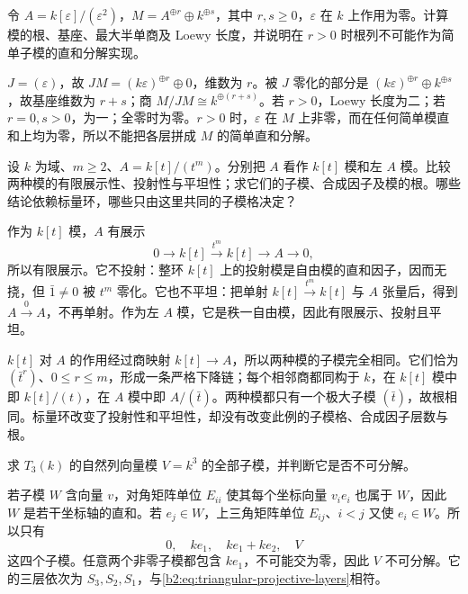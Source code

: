 \begin{exercise}\label{b2:ex:15-dual-numbers-loewy}
	令 \(A=k[\varepsilon]/(\varepsilon^2)\)，\(M=A^{\oplus r}\oplus k^{\oplus s}\)，其中 \(r,s\ge0\)，\(\varepsilon\) 在 \(k\) 上作用为零。计算模的根、基座、最大半单商及 Loewy 长度，并说明在 \(r>0\) 时根列不可能作为简单子模的直和分解实现。
\end{exercise}
\begin{solution}
	\(J=(\varepsilon)\)，故 \(JM=(k\varepsilon)^{\oplus r}\oplus0\)，维数为 \(r\)。被 \(J\) 零化的部分是 \((k\varepsilon)^{\oplus r}\oplus k^{\oplus s}\)，故基座维数为 \(r+s\)；商 \(M/JM\cong k^{\oplus(r+s)}\)。若 \(r>0\)，Loewy 长度为二；若 \(r=0,s>0\)，为一；全零时为零。\(r>0\) 时，\(\varepsilon\) 在 \(M\) 上非零，而在任何简单模直和上均为零，所以不能把各层拼成 \(M\) 的简单直和分解。
\end{solution}

\begin{exercise}\label{b2:ex:15-change-of-scalars-truncated}
	设 \(k\) 为域、\(m\ge2\)、\(A=k[t]/(t^m)\)。分别把 \(A\) 看作 \(k[t]\) 模和左 \(A\) 模。比较两种模的有限展示性、投射性与平坦性；求它们的子模、合成因子及模的根。哪些结论依赖标量环，哪些只由这里共同的子模格决定？
\end{exercise}
\begin{solution}
	作为 \(k[t]\) 模，\(A\) 有展示
	\[
		0\longrightarrow k[t]\xrightarrow{\,t^m\,}k[t]\longrightarrow A\longrightarrow0,
	\]
	所以有限展示。它不投射：整环 \(k[t]\) 上的投射模是自由模的直和因子，因而无挠，但 \(\bar1\ne0\) 被 \(t^m\) 零化。它也不平坦：把单射 \(k[t]\xrightarrow{t^m}k[t]\) 与 \(A\) 张量后，得到 \(A\xrightarrow{0}A\)，不再单射。作为左 \(A\) 模，它是秩一自由模，因此有限展示、投射且平坦。

	\(k[t]\) 对 \(A\) 的作用经过商映射 \(k[t]\to A\)，所以两种模的子模完全相同。它们恰为 \((\bar t^r)\)、\(0\le r\le m\)，形成一条严格下降链；每个相邻商都同构于 \(k\)，在 \(k[t]\) 模中即 \(k[t]/(t)\)，在 \(A\) 模中即 \(A/(\bar t)\)。两种模都只有一个极大子模 \((\bar t)\)，故根相同。标量环改变了投射性和平坦性，却没有改变此例的子模格、合成因子层数与根。
\end{solution}

\begin{exercise}\label{b2:ex:15-triangular-column-submodules}
	求 \(T_3(k)\) 的自然列向量模 \(V=k^3\) 的全部子模，并判断它是否不可分解。
\end{exercise}
\begin{solution}
	若子模 \(W\) 含向量 \(v\)，对角矩阵单位 \(E_{ii}\) 使其每个坐标向量 \(v_ie_i\) 也属于 \(W\)，因此 \(W\) 是若干坐标轴的直和。若 \(e_j\in W\)，上三角矩阵单位 \(E_{ij}\)、\(i<j\) 又使 \(e_i\in W\)。所以只有
	\[
		0,\quad ke_1,\quad ke_1+ke_2,\quad V
	\]
	这四个子模。任意两个非零子模都包含 \(ke_1\)，不可能交为零，因此 \(V\) 不可分解。它的三层依次为 \(S_3,S_2,S_1\)，与\eqref{b2:eq:triangular-projective-layers}相符。
\end{solution}

